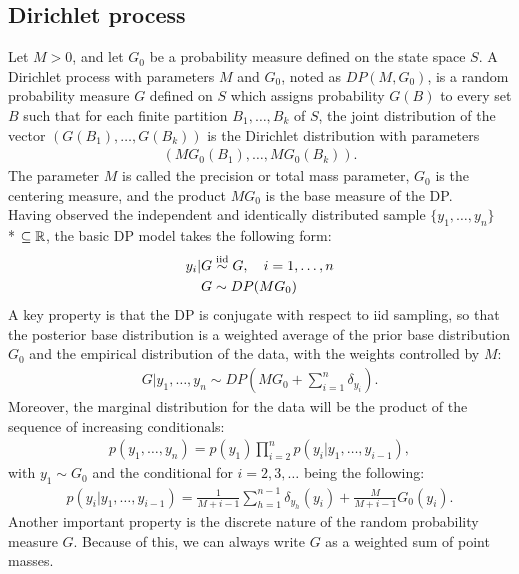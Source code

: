 \subsection{Dirichlet process}
Let $M>0$, and let $G_0$ be a probability measure defined on the state space $S$.
A Dirichlet process with parameters $M$ and $G_0$, noted as $DP(M,G_0)$, is a random probability measure $G$ defined on $S$ which assigns probability $G(B)$ to every set $B$ such that for each finite partition ${B_1,\dots,B_k}$ of $S$, the joint distribution of the  vector $(G(B_1),\dots,G(B_k))$ is the Dirichlet distribution with parameters
\begin{align*}
(MG_0(B_1),\dots,MG_0(B_k)).
\end{align*}
The parameter $M$ is called the precision or total mass parameter, $G_0$ is the centering measure, and the product $MG_0$ is the base measure of the DP. \\
Having observed the independent and identically distributed sample $\{y_1,\dots,y_n\}$ \\*
$\subseteq \mathbb R$, the basic DP model takes the following form:
\begin{equation}
	\begin{aligned}
	y_i | G &\stackrel{\text{iid}}{\sim} G, \quad i=1,\dots,n \\
	G &\sim DP(MG_0)
	\end{aligned}
\end{equation}
A key property is that the DP is conjugate with respect to iid sampling, so that the posterior base distribution is a weighted average of the prior base distribution $G_0$ and the empirical distribution of the data, with the weights controlled by $M$:
\begin{align}
	G | y_1,\dots,y_n \sim DP\left(M G_0 + \sum_{i=1}^n \delta_{y_i}\right).
\end{align}
Moreover, the marginal distribution for the data will be the product of the sequence of increasing conditionals:
\begin{align*}
	p(y_1,\dots,y_n)= p(y_1)\prod\limits_{i=2}^{n} p(y_i|y_1,\dots,y_{i-1}),
\end{align*}
with $y_1 \sim G_0$ and the conditional for $i=2,3,\dots$ being the following:
\begin{align*}
	p(y_i|y_1,\dots,y_{i-1})= \frac{1}{M+i-1}\sum_{h=1}^{n-1} \delta_{y_h}(y_i) +\frac{M}{M+i-1} G_0(y_i).
\end{align*}
Another important property is the discrete nature of the random probability measure $G$.
Because of this, we can always write $G$ as a weighted sum of point masses.
